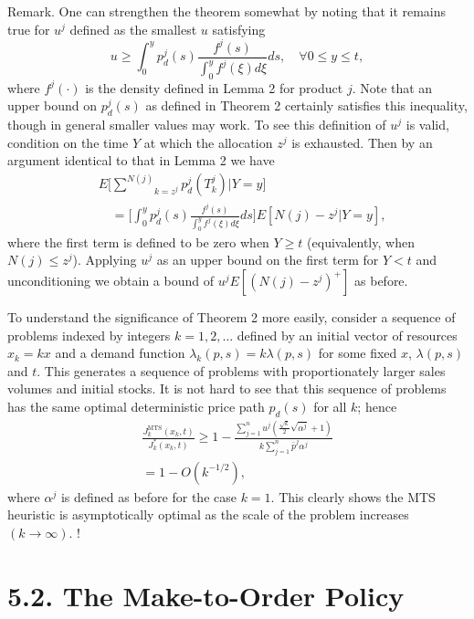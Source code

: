 Remark. One can strengthen the theorem somewhat by noting that it remains true for \(u^j\) defined as the smallest \(u\) satisfying
\[
u \geqslant \int_{0}^{y} p_d^j(s) \frac{ f^j(s) }{ \int_{0}^{y} f^j(\xi) d\xi } ds , \quad \forall 0 \leqslant y \leqslant t ,
\]
where \(f^j(\cdot)\) is the density defined in Lemma 2 for product \(j\). Note that an upper bound on \(p_d^j(s)\) as defined in Theorem 2 certainly satisfies this inequality, though in general smaller values may work. To see this definition of \(u^j\) is valid, condition on the time \(Y\) at which the allocation \(z^j\) is exhausted. Then by an argument identical to that in Lemma 2 we have
\[
\begin{array}{rl}
& E \Bigg[ \underset{k = z^j}{\overset{N(j)}{\sum}} p_d^j(T_k^j) \Bigg| Y = y \Bigg] \\
& \quad = \Bigg[ \int_{0}^{y} p_d^j(s) \frac{ f^j(s) }{ \int_{0}^{y} f^j(\xi) d\xi } ds \Bigg] E [N(j) - z^j | Y = y ] ,
\end{array}
\]
where the first term is defined to be zero when \(Y \geqslant t\) (equivalently, when \(N(j) \leqslant z^j\)). Applying \(u^j\) as an upper bound on the first term for \(Y < t\) and unconditioning we obtain a bound of \(u^j E [(N(j) - z^j)^{+}]\) as before.

To understand the significance of Theorem 2 more easily, consider a sequence of problems indexed by integers \(k = 1, 2, \dots\) defined by an initial vector of resources \(x_k = k x\) and a demand function \(\lambda_k(p, s) = k \lambda(p, s)\) for some fixed \(x\), \(\lambda(p, s)\) and \(t\). This generates a sequence of problems with proportionately larger sales volumes and initial stocks. It is not hard to see that this sequence of problems has the same optimal deterministic price path \(p_d(s)\) for all \(k\); hence
\[
\begin{array}{l}
\displaystyle \frac{J_k^{\mathrm{MTS}}(x_k, t)}{J_k^{*}(x_k, t)} \geqslant 1 - \frac{ \sum_{j=1}^{n} u^j \left( \frac{\sqrt{k}}{2} \sqrt{\alpha^j} + 1 \right) } { k \sum_{j=1}^{n} \bar{p}^j \alpha^j } \\
= 1 - O(k^{-1/2}) ,
\end{array}
\]
where \(\alpha^j\) is defined as before for the case \(k = 1\). This clearly shows the MTS heuristic is asymptotically optimal as the scale of the problem increases \((k \to \infty)\). !

\section{5.2. The Make-to-Order Policy}\label{the-make-to-order-policy}

